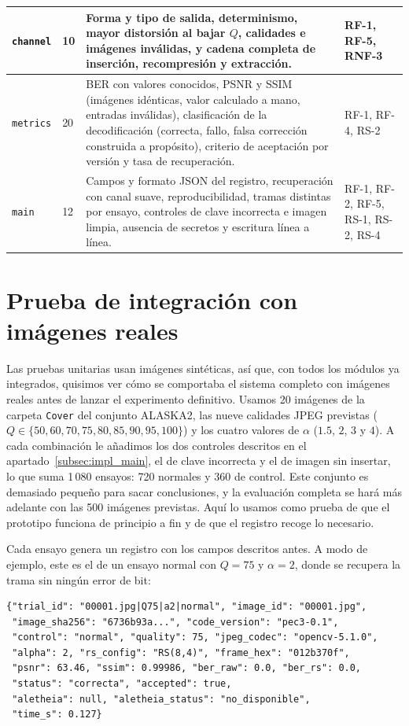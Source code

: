 \documentclass[IB]{TFUOC}%
\begin{document}
\begin{table}[H]
\begin{tabular}{|p{2.2cm}|p{1.6cm}|p{6.4cm}|p{3.2cm}|}
\hline
\texttt{channel} & 10 & Forma y tipo de salida, determinismo, mayor distorsión al bajar $Q$, calidades e imágenes inválidas, y cadena completa de inserción, recompresión y extracción. & RF-1, RF-5, RNF-3 \\
\hline
\texttt{metrics} & 20 & BER con valores conocidos, PSNR y SSIM (imágenes idénticas, valor calculado a mano, entradas inválidas), clasificación de la decodificación (correcta, fallo, falsa corrección construida a propósito), criterio de aceptación por versión y tasa de recuperación. & RF-1, RF-4, RS-2 \\
\hline
\texttt{main} & 12 & Campos y formato JSON del registro, recuperación con canal suave, reproducibilidad, tramas distintas por ensayo, controles de clave incorrecta e imagen limpia, ausencia de secretos y escritura línea a línea. & RF-1, RF-2, RF-5, RS-1, RS-2, RS-4 \\
\hline
\end{tabular}
\end{table}

\section{Prueba de integración con imágenes reales}
\label{sec:piloto}

Las pruebas unitarias usan imágenes sintéticas, así que, con todos los módulos ya integrados, quisimos ver cómo se comportaba el sistema completo con imágenes reales antes de lanzar el experimento definitivo. Usamos 20 imágenes de la carpeta \texttt{Cover} del conjunto ALASKA2, las nueve calidades JPEG previstas ($Q \in \{50, 60, 70, 75, 80, 85, 90, 95, 100\}$) y los cuatro valores de $\alpha$ ($1{.}5$, $2$, $3$ y $4$). A cada combinación le añadimos los dos controles descritos en el apartado~\ref{subsec:impl_main}, el de clave incorrecta y el de imagen sin insertar, lo que suma 1\,080 ensayos: 720 normales y 360 de control. Este conjunto es demasiado pequeño para sacar conclusiones, y la evaluación completa se hará más adelante con las 500 imágenes previstas. Aquí lo usamos como prueba de que el prototipo funciona de principio a fin y de que el registro recoge lo necesario.

Cada ensayo genera un registro con los campos descritos antes. A modo de ejemplo, este es el de un ensayo normal con $Q=75$ y $\alpha=2$, donde se recupera la trama sin ningún error de bit:

\begin{verbatim}
{"trial_id": "00001.jpg|Q75|a2|normal", "image_id": "00001.jpg",
 "image_sha256": "6736b93a...", "code_version": "pec3-0.1",
 "control": "normal", "quality": 75, "jpeg_codec": "opencv-5.1.0",
 "alpha": 2, "rs_config": "RS(8,4)", "frame_hex": "012b370f",
 "psnr": 63.46, "ssim": 0.99986, "ber_raw": 0.0, "ber_rs": 0.0,
 "status": "correcta", "accepted": true,
 "aletheia": null, "aletheia_status": "no_disponible",
 "time_s": 0.127}
\end{verbatim}
\end{document}
